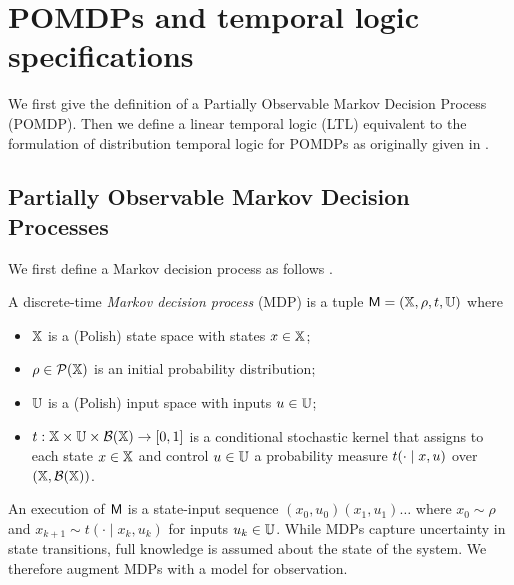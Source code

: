 \documentclass{ifacconf}
\newcommand{\cristi}[1]{{\color{olive}#1}}
\begin{document}
\section{POMDPs and temporal logic specifications}

We first give the definition of a Partially Observable Markov Decision Process (POMDP). Then we define a linear temporal logic (LTL) equivalent to the formulation of distribution temporal logic for POMDPs as originally given in \citep{JonesDTL2013}.

\subsection{Partially Observable Markov  Decision Processes}

We first define a Markov decision process as follows \citep{hll1996}.
\begin{definition}
\label{def:MDP}
  A discrete-time \emph{Markov decision process} (MDP) is a tuple $\mathsf{M} = ({\mathbb{X}}, \rho, t, {\mathbb{U}})$ where
  \begin{itemize}
    \item ${\mathbb{X}}$ is a (Polish) state space with states $x\in{\mathbb{X}}$; %
    \item $\rho \in \mathcal P({\mathbb{X}})$ is an initial probability distribution;
    \item ${\mathbb{U}}$ is a (Polish) input space with inputs $u\in{\mathbb{U}}$;
    \item $t:{\mathbb{X}}\times{\mathbb{U}}\times\mathcal B({\mathbb{X}})\rightarrow[0,1]$ is a conditional stochastic kernel that assigns to each state $x\in {\mathbb{X}}$ and control $u\in {\mathbb{U}}$ a probability measure $t(\cdot\mid x,u)$ over $({\mathbb{X}},\mathcal B({\mathbb{X}}))$.
  \end{itemize}
\end{definition}

An execution of $\mathsf{M}$ is a state-input sequence $(x_0, u_0)(x_1, u_1)\ldots$ where $x_0 \sim \rho$ and $x_{k+1} \sim t(\cdot \mid x_k, u_k)$ for inputs $u_k \in {\mathbb{U}}$. While MDPs capture uncertainty in state transitions, full knowledge is assumed about the state of the system. We therefore augment MDPs with a model for observation.

\end{document}
